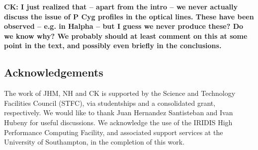 \documentclass[preprint, a4paper, 11pt]{aastex}
\begin{document}
{\bf CK: I just realized that -- apart from the intro -- we never
actually discuss the issue of P Cyg profiles in the optical
lines. These have been observed -- e.g. in Halpha -- but I guess we
never produce these? Do we know why? We probably should at least
comment on this at some point in the text, and possibly even briefly
in the conclusions.}











\subsection*{Acknowledgements}
The work of JHM, NH and CK is supported by the Science and Technology Facilities Council (STFC), 
via studentships and a consolidated grant, respectively. We would like to thank Juan Hernandez Santisteban and Ivan Hubeny 
for useful discussions. We acknowledge the use of the IRIDIS High Performance Computing Facility, 
and associated support services at the University of Southampton, in the completion of this work.


\newpage
\newpage

\end{document}
